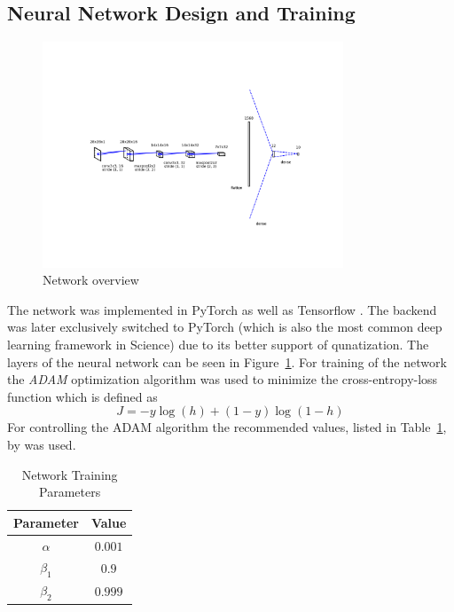 \subsection{Neural Network Design and Training}
\label{subsec:nntraining}


\begin{figure}
	\includegraphics[width=0.8\textwidth]{../../net/images/network}
	\caption{Network overview}
	\label{fig:network-structure}
\end{figure}


The network was implemented in PyTorch \cite{Paszke:2019aa} as well as Tensorflow \cite{MartinAbadi:2015aa}. The backend was later exclusively switched to PyTorch (which is also the most common deep learning framework in Science) due to its better support of qunatization. The layers of the neural network can be seen in Figure~\ref{fig:network-structure}. 
For training of the network the \emph{ADAM} optimization algorithm \cite{Kingma:2014aa} was used to minimize the cross-entropy-loss function which is defined as
\begin{equation}
    J = - y  \log(h) + (1-y)  \log(1-h)
\end{equation}
For controlling the ADAM algorithm the recommended values, listed in Table~\ref{tab:train-params}, by \cite{Kingma:2014aa} was used.
\begin{table}[ht]
	\centering
    \caption{Network Training Parameters}
    \begin{tabular}{cc}
        \toprule
            Parameter & Value \\
        \midrule
            $\alpha$   & $0.001$ \\
            $\beta_1$  & $0.9$   \\
            $\beta_2$  & $0.999$  \\          
        \bottomrule
    \end{tabular}
    \label{tab:train-params}
\end{table}


